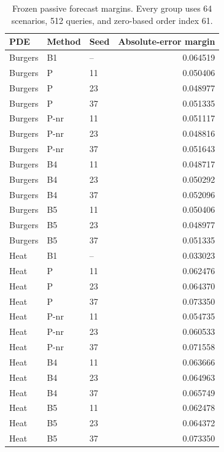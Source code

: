 \begin{table}[ht]
\centering\small
\caption{Frozen passive forecast margins. Every group uses 64 scenarios, 512 queries, and zero-based order index 61.}
\begin{tabular}{@{}lllr@{}}\toprule
PDE & Method & Seed & Absolute-error margin\\\midrule
Burgers & B1 & -- & 0.064519\\
Burgers & P & 11 & 0.050406\\
Burgers & P & 23 & 0.048977\\
Burgers & P & 37 & 0.051335\\
Burgers & P-nr & 11 & 0.051117\\
Burgers & P-nr & 23 & 0.048816\\
Burgers & P-nr & 37 & 0.051643\\
Burgers & B4 & 11 & 0.048717\\
Burgers & B4 & 23 & 0.050292\\
Burgers & B4 & 37 & 0.052096\\
Burgers & B5 & 11 & 0.050406\\
Burgers & B5 & 23 & 0.048977\\
Burgers & B5 & 37 & 0.051335\\
Heat & B1 & -- & 0.033023\\
Heat & P & 11 & 0.062476\\
Heat & P & 23 & 0.064370\\
Heat & P & 37 & 0.073350\\
Heat & P-nr & 11 & 0.054735\\
Heat & P-nr & 23 & 0.060533\\
Heat & P-nr & 37 & 0.071558\\
Heat & B4 & 11 & 0.063666\\
Heat & B4 & 23 & 0.064963\\
Heat & B4 & 37 & 0.065749\\
Heat & B5 & 11 & 0.062478\\
Heat & B5 & 23 & 0.064372\\
Heat & B5 & 37 & 0.073350\\
\bottomrule\end{tabular}
\end{table}
